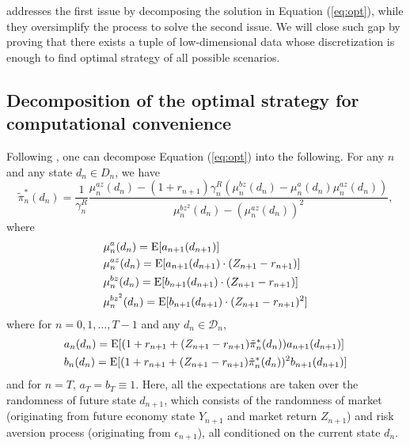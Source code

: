  addresses the first issue by decomposing the solution in Equation (\ref{eq:opt}), while they oversimplify the process to solve the second issue. We will close such gap by proving that there exists a tuple of low-dimensional data whose discretization is enough to find optimal strategy of all possible scenarios.

\subsection{Decomposition of the optimal strategy for computational convenience}
Following , one can decompose Equation (\ref{eq:opt}) into the following. For any $n$ and any state $d_n\in D_n$, we have \begin{equation}\label{eq:pi_decompose}
    \tilde \pi_n^*(d_n)=\frac{1}{\gamma_n^R}\frac{\mu_n^{az}(d_n)-(1+r_{n+1})\gamma_n^R(\mu_n^{bz}(d_n)-\mu_n^a(d_n)\mu_n^{az}(d_n))}{\mu_n^{bz^2}(d_n)-(\mu_n^{az}(d_n))^2},
\end{equation} where\begin{equation}\label{eq:mu}
    \begin{aligned}
    &\mu_n^{a}(d_n)=\mathrm{E}[a_{n+1}(d_{n+1})]\\
    &\mu_n^{az}(d_n)=\mathrm{E}[a_{n+1}(d_{n+1})\cdot(Z_{n+1}-r_{n+1})]\\
    &\mu_n^{bz}(d_n)=\mathrm{E}[b_{n+1}(d_{n+1})\cdot(Z_{n+1}-r_{n+1})]\\
    &\mu_n^{bz^2}(d_n)=\mathrm{E}[b_{n+1}(d_{n+1})\cdot(Z_{n+1}-r_{n+1})^2]
\end{aligned}
\end{equation} where for $n=0,1,\ldots,T-1$ and any $d_n\in\mathcal D_n$, \begin{equation}\label{eq:ab}
    \begin{aligned}
        &a_n(d_n)=\mathrm{E}[(1+r_{n+1}+(Z_{n+1}-r_{n+1})\tilde\pi^*_n(d_n))a_{n+1}(d_{n+1})]\\
        &b_n(d_n)=\mathrm{E}[(1+r_{n+1}+(Z_{n+1}-r_{n+1})\tilde\pi^*_n(d_n))^2b_{n+1}(d_{n+1})]\\
    \end{aligned}
\end{equation} and for $n=T$, $a_T=b_T\equiv1$. Here, all the expectations are taken over the randomness of future state $d_{n+1}$, which consists of the randomness of market (originating from future economy state $Y_{n+1}$ and market return $Z_{n+1}$) and risk aversion process (originating from $\epsilon_{n+1}$), all conditioned on the current state $d_n$.

